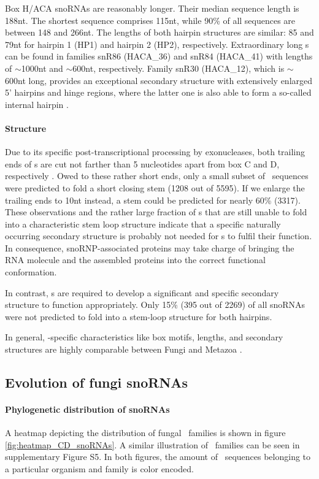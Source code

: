 Box H/ACA snoRNAs are reasonably longer. Their median sequence length
is 188nt. The shortest sequence comprises 115nt, while 90\% of all
sequences are between 148 and 266nt.  The lengths of both hairpin
structures are similar: 85 and 79nt for hairpin 1 (HP1) and hairpin 2
(HP2), respectively.  Extraordinary long \sno s can be found in
families snR86 (HACA\_36) and snR84 (HACA\_41) with lengths of
$\sim$1000nt and $\sim$600nt, respectively. Family snR30 (HACA\_12),
which is $\sim$600nt long, provides an exceptional secondary structure
with extensively enlarged 5' hairpins and hinge regions, where the
latter one is also able to form a so-called internal hairpin
\citep{Fayet-Lebaron:2009}.


\paragraph{\textbf{Structure}} Due to its specific
post-transcriptional processing by exonucleases, both trailing ends of
\cd s are cut not farther than 5 nucleotides apart from box C and D,
respectively \citep{Kishore:2013}. Owed to these rather short ends,
only a small subset of \sno\ sequences were predicted to fold a short
closing stem (1208 out of 5595).  If we enlarge the trailing ends to
10nt instead, a stem could be predicted for nearly 60\% (3317).  These
observations and the rather large fraction of \sno s that are still
unable to fold into a characteristic stem loop structure indicate that
a specific naturally occurring secondary structure is probably not
needed for \cd s to fulfil their function.  In consequence,
snoRNP-associated proteins may take charge of bringing the RNA
molecule and the assembled proteins into the correct functional
conformation.

In contrast, \haca s are required to develop a significant and
specific secondary structure to function appropriately. Only 15\% (395
out of 2269) of all snoRNAs were not predicted to fold into a
stem-loop structure for both hairpins.

In general, \sno -specific characteristics like box motifs, lengths,
and secondary structures are highly comparable between Fungi and
Metazoa \cite{Kehr:2014}.


\subsection{Evolution of fungi snoRNAs}
  
\paragraph{\textbf{Phylogenetic distribution of snoRNAs}}
A heatmap depicting the distribution of fungal \cd\ families is shown
in figure \ref{fig:heatmap_CD_snoRNAs}. A similar illustration of
\haca\ families can be seen in supplementary Figure S5. In both
figures, the amount of \sno\ sequences belonging to a particular
organism and family is color encoded.

